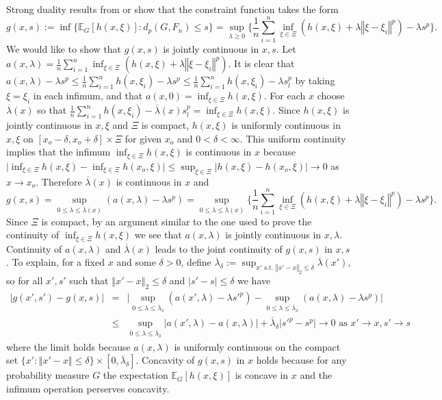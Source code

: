 \documentclass[mnsc,blindrev]{informs4} %
\newcommand{\norm}[1]{\left \Vert #1 \right\Vert}
\begin{document}
Strong duality results from \cite{gao2016distributionally} or \cite{blanchet2016robust} show that the constraint function takes the form
\begin{equation*}
g(x,s):=\inf\Big\{\mathbb E_{G}[h(x,\xi)]:d_p(G,F_n )\leq s\Big\}=\sup_{\lambda\geq 0}\Big\{\frac{1}{n}\sum_{i=1}^n\inf_{\xi\in\Xi}(h(x,\xi)+\lambda \norm{\xi-\xi_i}^p)-\lambda s^p\Big\}.
\end{equation*}
We would like to show that $g(x,s)$ is jointly continuous in $x,s$. Let $a(x,\lambda)=\frac{1}{n}\sum_{i=1}^n\inf_{\xi\in\Xi}(h(x,\xi)+\lambda \norm{\xi-\xi_i}^p)$. It is clear that $a(x,\lambda)-\lambda s^p\leq \frac{1}{n}\sum_{i=1}^nh(x,\xi_i)-\lambda s^p\leq \frac{1}{n}\sum_{i=1}^nh(x,\xi_i)-\lambda s_l^p$ by taking $\xi=\xi_i$ in each infimum, and that $a(x,0)=\inf_{\xi\in\Xi}h(x,\xi)$. For each $x$ choose $\overline{\lambda}(x)$ so that $\frac{1}{n}\sum_{i=1}^nh(x,\xi_i)-\overline{\lambda}(x) s_l^p=\inf_{\xi\in\Xi}h(x,\xi)$. Since $h(x,\xi)$ is jointly continuous in $x,\xi$ and $\Xi$ is compact, $h(x,\xi)$ is uniformly continuous in $x,\xi$ on $[x_o-\delta,x_o+\delta]\times \Xi$ for given $x_o$ and $0<\delta<\infty$. This uniform continuity implies that the infimum $\inf_{\xi\in\Xi}h(x,\xi)$ is continuous in $x$ because $\lvert \inf_{\xi\in\Xi}h(x,\xi)-\inf_{\xi\in\Xi}h(x_o,\xi) \rvert\leq \sup_{\xi\in\Xi}\lvert h(x,\xi)-h(x_o,\xi)\rvert\to 0$ as $x\to x_o$. Therefore $\overline{\lambda}(x)$ is continuous in $x$ and
\begin{equation*}
g(x,s)=\sup_{0\leq\lambda\leq \overline{\lambda}(x)}(a(x,\lambda)-\lambda s^p)=\sup_{0\leq\lambda\leq \overline{\lambda}(x)}\Big\{\frac{1}{n}\sum_{i=1}^n\inf_{\xi\in\Xi}(h(x,\xi)+\lambda \norm{\xi-\xi_i}^p)-\lambda s^p\Big\}.
\end{equation*}
Since $\Xi$ is compact, by an argument similar to the one used to prove the continuity of $\inf_{\xi\in\Xi}h(x,\xi)$ we see that $a(x,\lambda)$ is jointly continuous in $x,\lambda$. Continuity of $a(x,\lambda)$ and $\overline{\lambda}(x)$ leads to the joint continuity of $g(x,s)$ in $x,s$. To explain, for a fixed $x$ and some $\delta>0$, define $\overline{\lambda}_{\delta}:=\sup_{x'\text{ s.t. }\norm{x'-x}_2\leq \delta}\overline{\lambda}(x')$, so for all $x',s'$ such that $\norm{x'-x}_2\leq \delta$ and $\lvert s'-s\rvert\leq \delta$ we have
\begin{eqnarray*}
\lvert g(x',s')-g(x,s)\rvert &=&\lvert \sup_{0\leq\lambda\leq \overline{\lambda}_{\delta}}(a(x',\lambda)-\lambda {s'}^p)-\sup_{0\leq\lambda\leq \overline{\lambda}_{\delta}}(a(x,\lambda)-\lambda s^p)\rvert \\
&\leq &\sup_{0\leq\lambda\leq \overline{\lambda}_{\delta}}\lvert a(x',\lambda)-a(x,\lambda)\rvert+\overline{\lambda}_{\delta} \lvert {s'}^p-s^p\rvert\to 0\text{ as }x'\to x,s'\to s
\end{eqnarray*}
where the limit holds because $a(x,\lambda)$ is uniformly continuous on the compact set $\{x':\norm{x'-x}\leq \delta\}\times  [0,\overline{\lambda}_{\delta}]$. Concavity of $g(x,s)$ in $x$ holds because for any probability measure $G$ the expectation $\mathbb E_G[h(x,\xi)]$ is concave in $x$ and the infimum operation perserves concavity.
\end{document}
